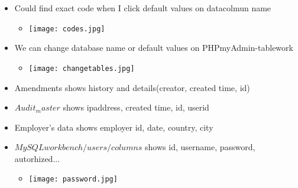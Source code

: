 \documentclass[paper=a4, fontsize=11pt]{scrartcl} %
\numberwithin{equation}{section} %
\numberwithin{figure}{section} %
\numberwithin{table}{section} %
\begin{document}
\begin{itemize}
\begin{itemize}
			\item Could find exact code when I click default values on datacolmun name
				\begin{itemize}
					\item
					\texttt{[image: codes.jpg]}
				\end{itemize}
\vspace{5cm}
			\item We can change database name or default values on PHPmyAdmin-tablework
				\begin{itemize}
					\item
					\texttt{[image: changetables.jpg]}
				\end{itemize}
			\item Amendments shows history and details(creator, created time, id)
			\item $Audit_master$ shows ipaddress, created time, id, userid
			\item Employer's data shows employer id, date, country, city
			\item $MySQLworkbench/users/columns$ shows id, username, password, autorhized...
				\begin{itemize}
					\item
					\texttt{[image: password.jpg]}
				\end{itemize}
	\end{itemize}	

\end{itemize}
\end{document}
